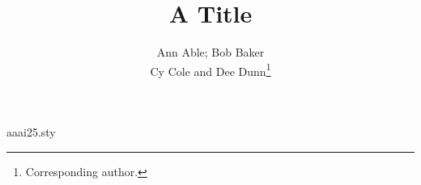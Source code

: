 \begin{filecontents*}[overwrite]{aaai25.sty}
\def\maketitle{\par\begingroup\def\thefootnote{\fnsymbol{footnote}}\twocolumn[\@maketitle]\@thanks\endgroup
  \setcounter{footnote}{0}\let\maketitle\relax\let\@maketitle\relax
  \gdef\@thanks{}\gdef\@author{}\gdef\@title{}\let\thanks\relax}
\def\@maketitle{\newcounter{eqfn}\setcounter{eqfn}{0}%
  \vbox{\let\footnote\thanks\relax\setcounter{footnote}{0}%
    \def\equalcontrib{\ifnum\value{eqfn}=0 \footnote{These authors contributed equally.}%
      \setcounter{eqfn}{\value{footnote}}\else\footnotemark[\value{eqfn}]\fi}%
    \hsize\textwidth\centering{\LARGE\bf\@title\par}\vskip 1em{\Large\bf\@author\par}}}
\end{filecontents*}
\documentclass{article}
\usepackage{aaai25}
\title{A Title}
\author{Ann Able\equalcontrib; Bob Baker\equalcontrib\\ Cy Cole\equalcontrib{} and Dee Dunn\thanks{Corresponding author.}}

\maketitle
Body.

